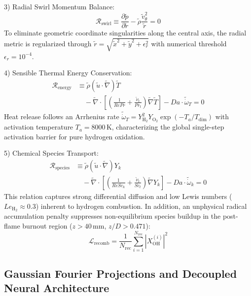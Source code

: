 \documentclass[reprint,aps,prfluids,superscriptaddress,twocolumn,floatfix]{revtex4-2}
\begin{document}
3) Radial Swirl Momentum Balance:
\begin{equation}
    \mathcal{R}_{\text{swirl}} \equiv \frac{\partial \tilde{p}}{\partial \tilde{r}} - \tilde{\rho} \frac{\tilde{v}_\theta^2}{\tilde{r}} = 0
    \label{eq:residual_swirl}
\end{equation}
To eliminate geometric coordinate singularities along the central axis, the radial metric is regularized through $\tilde{r} = \sqrt{\tilde{x}^2 + \tilde{y}^2 + \epsilon_r^2}$ with numerical threshold $\epsilon_r = 10^{-4}$.

4) Sensible Thermal Energy Conservation:
\begin{align}
    \mathcal{R}_{\text{energy}} &\equiv \tilde{\rho}(\tilde{u} \cdot \tilde{\nabla})\tilde{T} \nonumber \\
    &\quad - \tilde{\nabla} \cdot \left[ \left(\frac{1}{Re Pr} + \frac{\tilde{\nu}_t}{Pr_t}\right)\tilde{\nabla}\tilde{T} \right] - Da \cdot \tilde{\dot{\omega}}_T = 0
    \label{eq:residual_energy}
\end{align}
Heat release follows an Arrhenius rate $\tilde{\dot{\omega}}_T = Y_{\text{H}_2}^2 Y_{\text{O}_2} \exp(-T_a / T_{\text{dim}})$ with activation temperature $T_a = 8000\,\text{K}$, characterizing the global single-step activation barrier for pure hydrogen oxidation.

5) Chemical Species Transport:
\begin{align}
    \mathcal{R}_{\text{species}} &\equiv \tilde{\rho}(\tilde{u} \cdot \tilde{\nabla})Y_k \nonumber \\
    &\quad - \tilde{\nabla} \cdot \left[ \left(\frac{1}{Re Sc_k} + \frac{\tilde{\nu}_t}{Sc_t}\right)\tilde{\nabla}Y_k \right] - Da \cdot \tilde{\dot{\omega}}_k = 0
    \label{eq:residual_species}
\end{align}
This relation captures strong differential diffusion and low Lewis numbers ($Le_{\text{H}_2} \approx 0.3$) inherent to hydrogen combustion. In addition, an unphysical radical accumulation penalty suppresses non-equilibrium species buildup in the post-flame burnout region ($z > 40\,\text{mm}$, $z/D > 0.471$):
\begin{equation}
    \mathcal{L}_{\text{recomb}} = \frac{1}{N_{\text{rec}}} \sum_{i=1}^{N_{\text{rec}}} |X_{\text{OH}}^{(i)}|^2
    \label{eq:loss_recomb}
\end{equation}

\subsection{Gaussian Fourier Projections and Decoupled Neural Architecture}
\label{subsec:fourier_resnet}
\end{document}
